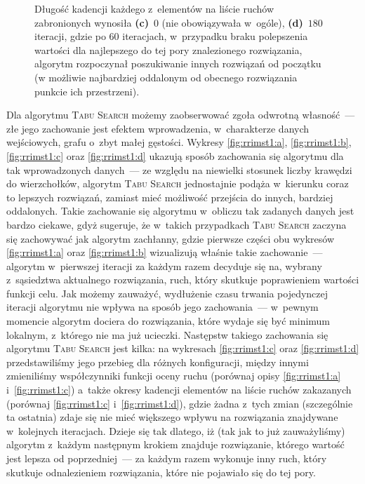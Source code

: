 \begin{figure}[!htbp]
{		Długość kadencji każdego z~elementów na liście ruchów zabronionych wynosiła \textbf{(c)}~$0$ (nie obowiązywała w~ogóle), \textbf{(d)}~$180$ iteracji, gdzie po $60$ iteracjach, w~przypadku braku polepszenia wartości dla najlepszego do tej pory znalezionego rozwiązania, algorytm rozpoczynał poszukiwanie innych rozwiązań od początku (w możliwie najbardziej oddalonym od obecnego rozwiązania punkcie ich przestrzeni).
	}
	\label{fig:rrimst1}
\end{figure}

Dla algorytmu \textsc{Tabu Search} możemy zaobserwować zgoła odwrotną własność~--- złe jego zachowanie jest efektem wprowadzenia, w~charakterze danych wejściowych, grafu o~zbyt małej gęstości.
Wykresy \ref{fig:rrimst1:a}, \ref{fig:rrimst1:b}, \ref{fig:rrimst1:c} oraz \ref{fig:rrimst1:d} ukazują sposób zachowania się algorytmu dla tak wprowadzonych danych~--- ze względu na niewielki stosunek liczby krawędzi do wierzchołków, algorytm \textsc{Tabu Search} jednostajnie podąża w~kierunku coraz to lepszych rozwiązań, zamiast mieć możliwość przejścia do innych, bardziej oddalonych.
Takie zachowanie się algorytmu w~obliczu tak zadanych danych jest bardzo ciekawe, gdyż sugeruje, że w~takich przypadkach \textsc{Tabu Search} zaczyna się zachowywać jak algorytm zachłanny, gdzie pierwsze części obu wykresów \ref{fig:rrimst1:a} oraz \ref{fig:rrimst1:b} wizualizują właśnie takie zachowanie~--- algorytm w~pierwszej iteracji za każdym razem decyduje się na, wybrany z~sąsiedztwa aktualnego rozwiązania, ruch, który skutkuje poprawieniem wartości funkcji celu.
Jak możemy zauważyć, wydłużenie czasu trwania pojedynczej iteracji algorytmu nie wpływa na sposób jego zachowania~--- w~pewnym momencie algorytm dociera do rozwiązania, które wydaje się być minimum lokalnym, z~którego nie ma już ucieczki.
Następstw takiego zachowania się algorytmu \textsc{Tabu Search} jest kilka: na wykresach \ref{fig:rrimst1:c} oraz \ref{fig:rrimst1:d} przedstawiliśmy jego przebieg dla różnych konfiguracji, między innymi zmieniliśmy współczynniki funkcji oceny ruchu (porównaj opisy \ref{fig:rrimst1:a} i~\ref{fig:rrimst1:c}) a~także okresy kadencji elementów na liście ruchów zakazanych (porównaj \ref{fig:rrimst1:c} i~\ref{fig:rrimst1:d}), gdzie żadna z~tych zmian (szczególnie ta ostatnia) zdaje się nie mieć większego wpływu na rozwiązania znajdywane w~kolejnych iteracjach.
Dzieje się tak dlatego, iż (tak jak to już zauważyliśmy) algorytm z~każdym następnym krokiem znajduje rozwiązanie, którego wartość jest lepsza od poprzedniej~--- za każdym razem wykonuje inny ruch, który skutkuje odnalezieniem rozwiązania, które nie pojawiało się do tej pory.
